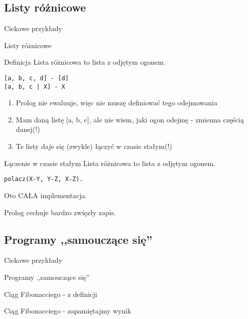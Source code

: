 \documentclass[blue]{beamer}
\newcommand{\tytulprz}[2]{\begin{frame}\begin{center}\begin{Huge}Ciekawe przykłady\end{Huge}

\hspace{20pt}

\begin{huge}#1\end{huge}

\hspace{10pt}

\begin{large}#2\end{large}\end{center}\end{frame}}
\begin{document}
\subsection{Listy różnicowe}
\tytulprz{Listy różnicowe}{}
\begin{frame}[fragile]{Definicja}
Lista różnicowa to lista z odjętym ogonem.
\begin{lstlisting}
[a, b, c, d] - [d]
[a, b, c | X] - X
\end{lstlisting}
\begin{enumerate}
\item Prolog nie ewaluuje, więc nie muszę definiować tego odejmowania
\item Mam daną listę [a, b, c], ale nie wiem, jaki ogon odejmę - zmienna częścią danej(!)
\item Te listy daje się (zwykle) łączyć w czasie stałym(!)
\end{enumerate}
\end{frame}
\begin{frame}[fragile]{Łączenie w czasie stałym}
Lista różnicowa to lista z odjętym ogonem.
\begin{lstlisting}
polacz(X-Y, Y-Z, X-Z).
\end{lstlisting}

Oto CAŁA implementacja.

Prolog cechuje bardzo zwięzły zapis.
\end{frame}
\subsection{Programy ,,samouczące się''}
\tytulprz{Programy ,,samouczące się''}{}
\begin{frame}{Ciąg Fibonacciego - z definicji}


\end{frame}
\begin{frame}{Ciąg Fibonacciego - zapamiętajmy wynik}

\end{frame}
\end{document}
